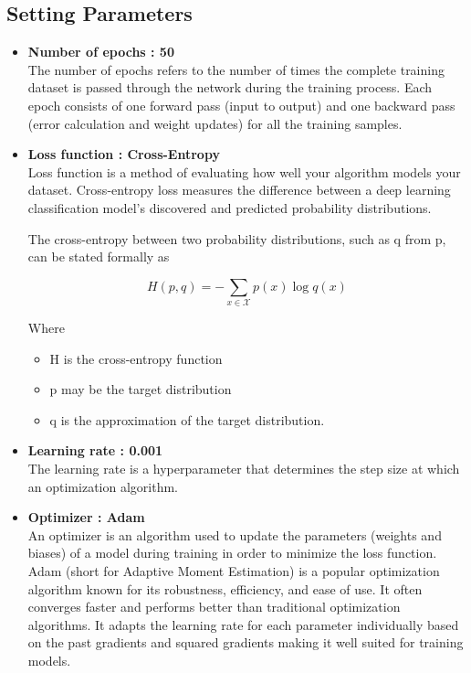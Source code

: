 	\subsection{Setting Parameters}
	\begin{itemize}
		\item \textbf{Number of epochs : 50} \\
			The number of epochs refers to the number of times the complete training dataset is passed through the network during the training process. Each epoch consists of one forward pass (input to output) and one backward pass (error calculation and weight updates) for all the training samples.
		\item \textbf{Loss function : Cross-Entropy}\cite{mao2023crossentropy} \\
			Loss function is a method of evaluating how well your algorithm models your dataset. Cross-entropy loss measures the difference between a deep learning classification model's discovered and predicted probability distributions.

			The cross-entropy between two probability distributions, such as q from p, can be stated formally as
			
			\begin{equation}
				H(p, q) = -\sum_{x \in \mathcal{X}} p(x) \log q(x)
			\end{equation}

			Where
			\begin{itemize}
				\item H is the cross-entropy function
				\item p may be the target distribution
				\item q is the approximation of the target distribution.
			\end{itemize} 

		\item \textbf{Learning rate : 0.001} \\
			The learning rate is a hyperparameter that determines the step size at which an optimization algorithm.
		\item \textbf{Optimizer : Adam} \cite{kingma2017adam}\\
			An optimizer  is an algorithm used to update the parameters (weights and biases) of a model during training in order to minimize the loss function. 
			Adam (short for Adaptive Moment Estimation) is a popular optimization algorithm known for its robustness, efficiency, and ease of use. It often converges faster and performs better than traditional optimization algorithms.
			It adapts the learning rate for each parameter individually based on the past gradients and squared gradients making it well suited for training models.
	\end{itemize}

